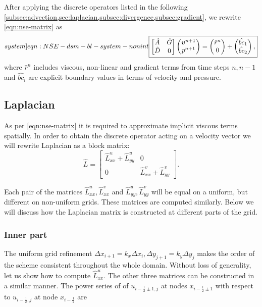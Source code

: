\documentclass{article}
\numberwithin{equation}{section}
\begin{document}
After applying the discrete operators listed in the following \cref{subsec:advection,sec:laplacian,subsec:divergence,subsec:gradient}, we rewrite \cref{eqn:nse-matrix}  as
\begin{equation}\label[system]{eqn:NSE-dsm-bl-system-nonint}
	\boxed{\begin{bmatrix}
		\hat{A} & \hat{G} \\
		\hat{D} & 0
	\end{bmatrix}
	\begin{pmatrix}
		\boldsymbol{v}^{n+1} \\ 
		p^{n+1}
	\end{pmatrix}
	=
	\begin{pmatrix}
		\hat{r}^n \\
		0
	\end{pmatrix}
	+
	\begin{pmatrix}
		\hat{bc}_1\\
		\hat{bc}_2
	\end{pmatrix},}
\end{equation}
where $\hat{r}^n$ includes viscous, non-linear and gradient terms from time steps $n,n-1$ and $\hat{bc}_i$ are explicit boundary values in terms of velocity and pressure.


\subsection{Laplacian}\label{sec:laplacian}

As per \cref{eqn:nse-matrix} it is required to approximate implicit viscous terms spatially. In order to obtain the discrete operator acting on a velocity vector we will rewrite Laplacian as a block matrix:
\begin{equation*}
	\hat L=
	\begin{bmatrix}
  \hat{L}^u_{xx}+\hat{L}^u_{yy} & 0 \\
  0 & \hat{L}^v_{xx}+\hat{L}^v_{yy}
\end{bmatrix}.
\end{equation*}

Each pair of the matrices $\hat{L}^u_{xx},\hat{L}^v_{xx}$ and $\hat{L}^u_{yy},\hat{L}^v_{yy}$ will be equal on a uniform, but different on non-uniform grids. These matrices are computed similarly. Below we will discuss how the Laplacian matrix is constructed at different parts of the grid.

\subsubsection{Inner part}\label{subsubsec:laplacian-inner}
The uniform grid refinement $\Delta x_{i+1}=k_x\Delta x_i,\Delta y_{j+1}=k_y\Delta y_j$ makes the order of the scheme consistent throughout the whole domain. Without loss of generality, let us show how to compute $\hat{L}^u_{xx}$. The other three matrices can be constructed in a similar manner. The power series of of $u_{i-\frac{1}{2}\pm 1,j}$ at nodes $x_{i - \frac{1}{2}\pm 1}$ with respect to $u_{i - \frac{1}{2},j}$ at node $x_{i-\frac{1}{2}}$ are
\end{document}
